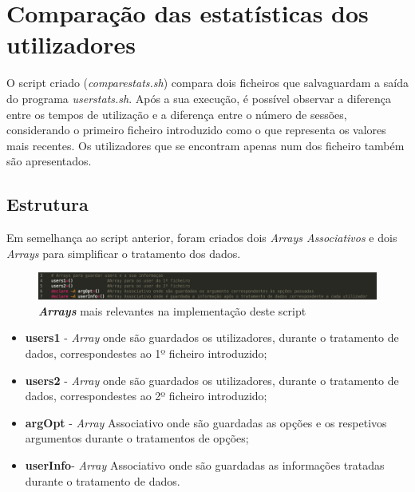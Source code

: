 \documentclass[10pt,portuguese]{article}
\begin{document}
\clearpage
\section{Comparação das estatísticas dos utilizadores}
O script criado (\textit{comparestats.sh}) compara dois ficheiros que salvaguardam a saída do programa \textit{userstats.sh}. Após a sua execução, é possível observar a diferença entre os tempos de utilização e a diferença entre o número de sessões, considerando o primeiro ficheiro introduzido como o que representa os valores mais recentes. Os utilizadores que se encontram apenas num dos ficheiro também são apresentados.
\subsection{Estrutura}
\par Em semelhança ao script anterior, foram criados dois \textit{Arrays Associativos} e dois \textit{Arrays} para simplificar o tratamento dos dados.

\begin{figure}[!h]
    \centering
    \includegraphics[width=\textwidth]{comparestats/estrutura_c.png}
    \caption{\textbf{\textit{Arrays}} mais relevantes na implementação deste script}
\end{figure}
\newline
 \begin{itemize}
   \item {\textbf{users1}}   - \textit{Array} onde são guardados os utilizadores, durante o tratamento de dados, correspondestes ao 1º ficheiro introduzido;
   \\
   \item {\textbf{users2}}   - \textit{Array} onde são guardados os utilizadores, durante o tratamento de dados, correspondestes ao 2º ficheiro introduzido;
   \\
   \item {\textbf{argOpt}}  - \textit{Array} Associativo onde são guardadas as opções e os respetivos argumentos durante o tratamentos de opções;
   \\
   \item {\textbf{userInfo}}- \textit{Array} Associativo onde são guardadas as informações tratadas durante o tratamento de dados.
 \end{itemize}
\clearpage
\end{document}
